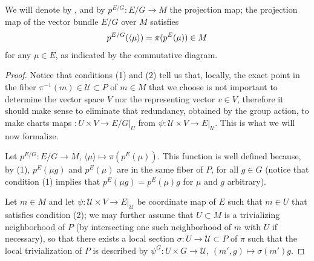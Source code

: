 \begin{proposition}
We will denote by , and by $p^{E/G}:E/G \to M$ the projection map; the projection map of the vector bundle $E/G$ over $M$ satisfies 
\begin{align} \label{eqnProjectionOfQuotient}
    p^{E/G}(\left\langle \mu \right\rangle) = \pi(p^E(\mu)) \in M
\end{align}
for any $\mu \in E$, as indicated by the commutative diagram. 

\end{proposition}

\begin{proof}
Notice that conditions (1) and (2) tell us that, locally, the exact point in the fiber $\pi^{-1}(m) \in \mathcal U \subset P$ of $m \in M$ that we choose is not important to determine the vector space $V$ nor the representing vector $v \in V$, therefore it should make sense to eliminate that redundancy, obtained by the group action, to make charts maps $:U \times V \to E/G|_U$ from $\psi:\mathcal U \times V \to E|_{\mathcal U}$. This is what we will now formalize.

Let $p^{E/G}: E/G \to M$, $\langle \mu \rangle \mapsto \pi(p^E(\mu))$. This function is well defined because, by (1), $p^E(\mu g)$ and $p^E(\mu)$ are in the same fiber of $P$, for all $g \in G$ (notice that condition (1) implies that $p^E(\mu g) = p^E(\mu) g$ for $\mu$ and $g$ arbitrary).

Let $m \in M$ and let $\psi: \mathcal U \times V \to E|_{\mathcal U}$ be coordinate map of $E$  such that $m \in U$ that satisfies condition (2); we may further assume that $U \subset M$ is a trivializing neighborhood of $P$ (by intersecting one such neighborhood of $m$ with $U$ if necessary), so that there exists a local section $\sigma: U \to \mathcal U \subset P$  of $\pi$ such that the local trivialization of $P$ is described by $\psi^G: U\times G \to \mathcal U$, $(m', g) \mapsto \sigma(m')g$.


\end{proof}
